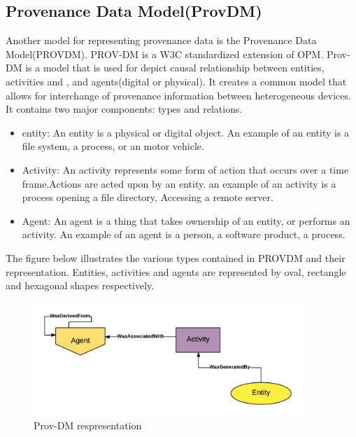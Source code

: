\subsection{Provenance Data Model(Prov\-DM)}

Another model for representing provenance data is the Provenance Data Model(PROV\-DM). PROV-DM is a W3C standardized extension of OPM. Prov-DM is a model that is used for depict causal relationship between entities, activities and , and agents(digital or physical).  It creates a common model that allows for interchange of provenance information between heterogeneous devices. It contains two major components: types and relations. 


\begin{itemize}

\item entity: An entity is a physical or digital object. An example of an entity is a file system, a process, or an motor vehicle.

\item Activity: An activity represents some form of action that occurs over a time frame.Actions are acted upon by an entity. an example of an activity is a process opening a file directory, Accessing a remote server.

\item Agent: An agent is a thing that takes ownership of an entity, or performs an activity. An example of an agent is a person, a software product, a process.
\end{itemize}

The figure below illustrates the various types contained in PROV\-DM and their representation. Entities, activities and agents are represented by oval, rectangle and hexagonal shapes respectively.

\begin{figure}[h]
\begin{center}

\includegraphics[width=4.0in]{prov_dm_1.PNG}
\end{center}
\caption{Prov-DM respresentation }
\end{figure}

